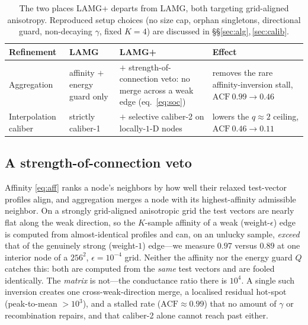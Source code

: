 \documentclass[leqno,letterpaper]{etna}
\newcommand{\acf}{\mathrm{ACF}}
\begin{document}
\begin{table}[h!]\centering
\caption{The two places LAMG+ departs from LAMG, both targeting grid-aligned anisotropy. Reproduced setup choices (no size cap, orphan singletons, directional guard,
non-decaying $\gamma$, fixed $K{=}4$) are discussed in \S\S\ref{sec:alg},\,\ref{sec:calib}.}\label{tab:diff}
\begin{tabular}{>{\raggedright\arraybackslash}p{2.1cm}
                >{\raggedright\arraybackslash}p{2.4cm}
                >{\raggedright\arraybackslash}p{3.5cm}
                >{\raggedright\arraybackslash}p{3.1cm}}
\toprule
Refinement & LAMG & LAMG+ & Effect\\
\midrule
Aggregation & affinity $+$ energy guard only & $+$ strength-of-connection veto: no merge across
a weak edge (eq.~\eqref{eq:soc}) & removes the rare affinity-inversion stall,
$\acf\ 0.99\!\to\!0.46$\\
Interpolation caliber & strictly caliber-1 & $+$ selective caliber-2 on locally-$1$-D nodes &
lowers the $q\!\approx\!2$ ceiling, $\acf\ 0.46\!\to\!0.11$\\
\bottomrule
\end{tabular}
\end{table}

\subsection{A strength-of-connection veto}\label{sec:soc}
Affinity \eqref{eq:aff} ranks a node's neighbors by how well their relaxed test-vector
profiles align, and aggregation merges a node with its highest-affinity admissible neighbor.
On a strongly grid-aligned anisotropic grid the test vectors are nearly flat along the weak
direction, so the $K$-sample affinity of a weak (weight-$\epsilon$) edge is computed from
almost-identical profiles and can, on an unlucky sample, \emph{exceed} that of the genuinely
strong (weight-$1$) edge---we measure $0.97$ versus $0.89$ at one interior node of a $256^2$,
$\epsilon=10^{-4}$ grid. Neither the affinity nor the energy guard $Q$ catches this: both are
computed from the \emph{same} test vectors and are fooled identically. The \emph{matrix} is
not---the conductance ratio there is $10^4$. A single such inversion creates one
cross-weak-direction merge, a localised residual hot-spot (peak-to-mean $>10^3$), and a stalled
rate ($\acf\approx0.99$) that no amount of $\gamma$ or recombination repairs, and that
caliber-2 alone cannot reach past either.
\end{document}
